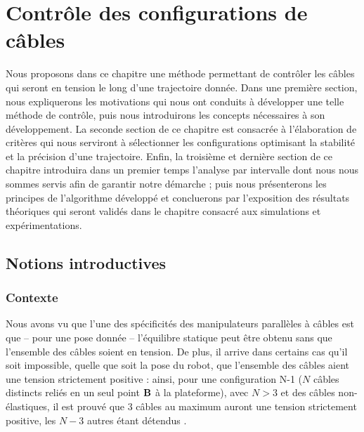 \chapter{Contr\^ole des configurations de c\^ables} \label{chap03}

Nous proposons dans ce chapitre une m\'ethode permettant de contr\^oler les
c\^ables qui seront en tension le long d'une trajectoire donn\'ee. Dans une
premi\`ere section, nous expliquerons les motivations qui nous ont
conduits \`a d\'evelopper une telle m\'ethode de contr\^ole, puis 
nous introduirons les concepts n\'ecessaires \`a son d\'eveloppement. La 
seconde section de ce chapitre est consacr\'ee \`a l'\'elaboration de 
crit\`eres qui nous serviront \`a s\'electionner les configurations optimisant 
la stabilit\'e et la pr\'ecision d'une trajectoire. Enfin, la troisi\`eme et 
derni\`ere section de ce chapitre introduira dans un premier temps l'analyse 
par intervalle dont nous nous sommes servis afin de garantir notre d\'emarche ; 
puis nous pr\'esenterons les principes de l'algorithme d\'evelopp\'e et 
concluerons par l'exposition des r\'esultats th\'eoriques qui seront valid\'es 
dans le chapitre consacr\'e aux simulations et exp\'eri\-mentations.

\section{Notions introductives}

\subsection{Contexte}

Nous avons vu que l'une des sp\'ecificit\'es des manipulateurs parall\`eles \`a
c\^ables est que -- pour une pose donn\'ee -- l'\'equilibre statique peut
\^etre obtenu sans que l'ensemble des c\^ables soient en tension. De plus, il
arrive dans certains cas qu'il soit impossible, quelle que soit la pose du 
robot, que l'ensemble des c\^ables aient une tension strictement positive : 
ainsi, pour une configuration N-1 ($N$ câbles distincts reliés en un seul point 
${\bf B}$ à la plateforme), avec $N> 3$ et des c\^ables non-\'elastiques, il
est prouv\'e que 3 c\^ables au maximum auront une tension strictement positive,
les $N-3$ autres \'etant d\'etendus \cite{merlet2012}.

